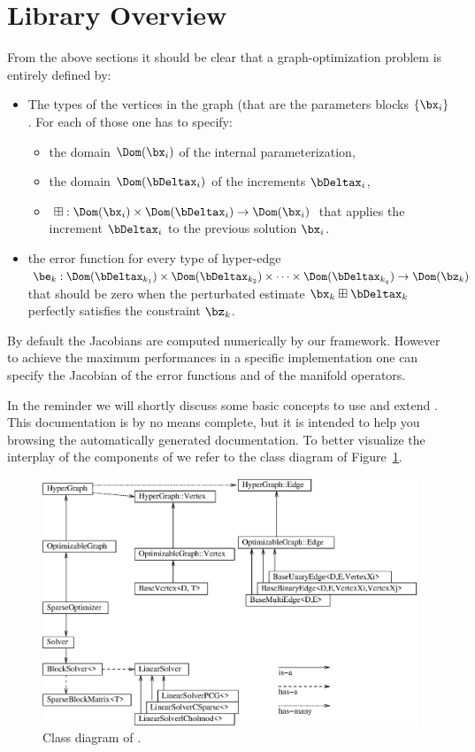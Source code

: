 \documentclass[a4paper]{article}
\begin{document}
\section{Library Overview}
From the above sections it should be clear that a graph-optimization problem is entirely defined by:
\begin{itemize}
\item The types of the vertices in the graph (that are the parameters blocks $\{\bx_i\}$. 
  For each of those one has to specify:
  \begin{itemize}
    \item the domain $\Dom(\bx_i)$ of the internal parameterization, 
    \item the domain $\Dom(\bDeltax_i)$ of the increments $\bDeltax_i$,
    \item $\boxplus: \Dom(\bx_i) \times \Dom(\bDeltax_i) \rightarrow \Dom(\bx_i)$ that 
      applies the increment $\bDeltax_i$ to the previous solution $\bx_i$.
  \end{itemize}
\item the error function for every type of hyper-edge
  $\be_{k}:\Dom(\bDeltax_{k_1}) \times \Dom(\bDeltax_{k_2}) \times \dots \times
  \Dom(\bDeltax_{k_q}) \rightarrow \Dom(\bz_{k})$ that should be zero when
  the perturbated estimate $\bx_{k} \boxplus \bDeltax_{k}$ perfectly satisfies the constraint $\bz_{k}$.
\end{itemize}
By default the Jacobians are computed numerically by our
framework. However to achieve the maximum performances in a specific
implementation one can specify the Jacobian of the error functions and
of the manifold operators.

In the reminder we will shortly discuss some basic concepts to use and
extend \gopt.  This documentation is by no means complete, but it is
intended to help you browsing the automatically generated
documentation. To better visualize the interplay of the components of
\gopt{} we refer to the class diagram of Figure~\ref{fig:classes}.
\begin{figure}
\centering
\includegraphics[width=0.7\columnwidth]{pics/classes.eps}
\caption{Class diagram of \gopt{}.}
\label{fig:classes}
\end{figure}
\end{document}
